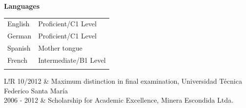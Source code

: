 \documentclass[a4paper, 12]{scrartcl}
\newcommand{\preSectionSpace}{\vspace{0.2cm}}
\newcommand{\afterSectionSpace}{\vspace{0.5cm}}
\newcommand\VRule{\color{lightgray}\vrule width 0.3pt}
\begin{document}
	
	\preSectionSpace
	
	\preSectionSpace
	\preSectionSpace
	\hspace{0.2cm}\large{\textcolor{mainColor}{\textbf{Languages}}}
	\afterSectionSpace

	\begin{minipage}{0.3\textwidth}
		\begin{flushleft}
			\begin{tabular}{ll}
				English & Proficient/C1 Level \\[2pt]
				German & Proficient/C1 Level \\[2pt] 
				Spanish & Mother tongue\\[2pt] 
				French & Intermediate/B1 Level\\[2pt] 
				&\\
			\end{tabular}	
		\end{flushleft}
	\end{minipage}
	
	\preSectionSpace
	\vspace{0.3cm}
	\hspace{0.2cm}{\large{\textcolor{mainColor}{\textbf{Awards}}}}
	\afterSectionSpace
	
	\begin{tabular}{L!{\VRule}R}
		10/2012 & Maximum distinction in final examination, Universidad Técnica Federico Santa María \\
		2006 - 2012 & Scholarship for Academic Excellence, Minera Escondida Ltda.
	\end{tabular}
	
	\vspace{0.5cm}
	
\end{document}
